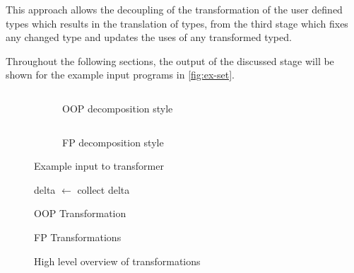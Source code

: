 \documentclass[ oneside,%
                    author={James Elgar},
                    degree={MEng},
                     title={Bidirectional transformer between functional and \\ object-oriented programming in Rust},
                  subtitle={}]{dissertation}
\newcommand{\codefileLN}[4]{\inputminted[xleftmargin=20pt,linenos, breaklines, firstline=#3, lastline=#4]{#1}{#2}}
\newcommand{\rustfileLN}[3]{\codefileLN{rust}{../#1.rs}{#2}{#3}}
\newcommand{\rustexampleLN}[3]{\rustfileLN{examples/src/#1}{#2}{#3}}
\begin{document}
This approach allows the decoupling of the transformation of the user defined types which results in the translation of types, from the third stage which fixes any changed type and updates the uses of any transformed typed. 

Throughout the following sections, the output of the discussed stage will be shown for the example input programs in \autoref{fig:ex-set}.

\begin{figure}
\centering
\begin{subfigure}{.5\textwidth}
    \rustexampleLN{exp/oop}{1}{22}
    \caption{OOP decomposition style}
    \label{fig:dec-ex-oop}
\end{subfigure}%
\begin{subfigure}{.5\textwidth}
    \rustexampleLN{exp/fp}{1}{11}
    \caption{FP decomposition style}
    \label{fig:dec-ex-fp}
\end{subfigure}
\caption{Example input to transformer}
\label{fig:ex-exp}
\end{figure}

\begin{figure}
\begin{minipage}{0.46\textwidth}
    \begin{algorithm}[H]
    delta $\leftarrow$ collect delta \\
    \caption{OOP Transformation}
    \label{alg:high-level-oop}
    \end{algorithm}
\end{minipage}
\hfill
\begin{minipage}{0.46\textwidth}
    \begin{algorithm}[H]
    \caption{FP Transformations}
    \label{alg:high-level-fp}
    \end{algorithm}
\end{minipage}
\caption{High level overview of transformations}
\label{alg:high-level}
\end{figure}
\end{document}
